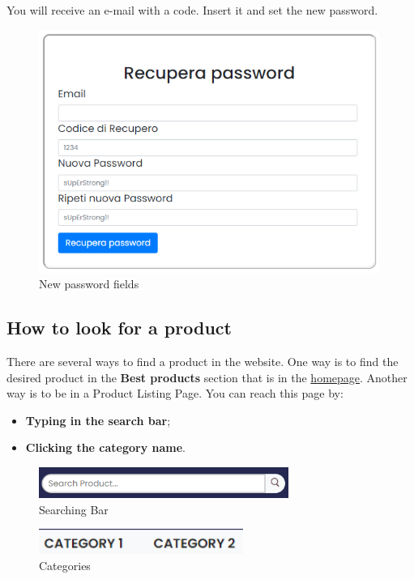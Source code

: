 You will receive an e-mail with a code. Insert it and set the new password.
\begin{figure}[H]
    \centering
    \includegraphics[width=30em]{res/images/cliente/newpassword.png}
    \caption{New password fields}
\end{figure}


\subsection{How to look for a product} \label{_lookforproduct}
There are several ways to find a product in the website. One way is to find the desired product in the \textbf{Best products} section that is in the \hyperref[_homepage]{homepage}. Another way is to be in a Product Listing Page. You can reach this page by:
\begin{itemize} 
    \item \textbf{Typing in the search bar};
    \item \textbf{Clicking the category name}.
\end{itemize}

\begin{figure}[H]
    \centering
    \includegraphics[width=22em]{res/images/cliente/searchingbar.png}
    \caption{Searching Bar}
\end{figure}

\begin{figure}[H]
    \centering
    \includegraphics[width=18em]{res/images/cliente/categories.png}
    \caption{Categories}
\end{figure}

